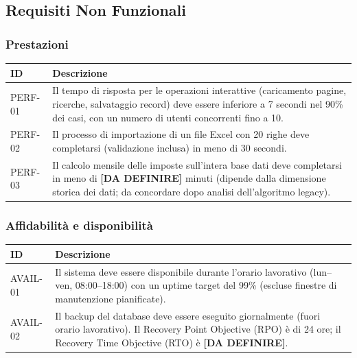 \documentclass[12pt, a4paper]{article}
\begin{document}
\subsection{Requisiti Non Funzionali}

\subsubsection{Prestazioni}

\begin{longtable}{@{}p{2.5cm}p{9.5cm}@{}}
  \toprule
  \textbf{ID} & \textbf{Descrizione} \\
  \midrule
  \endhead

  PERF-01 &
  Il tempo di risposta per le operazioni interattive (caricamento pagine, ricerche, salvataggio
  record) deve essere inferiore a 7 secondi nel 90\% dei casi, con un numero di utenti
  concorrenti fino a 10. \\[6pt]

  PERF-02 &
  Il processo di importazione di un file Excel con 20 righe deve completarsi (validazione
  inclusa) in meno di 30 secondi. \\[6pt]

  PERF-03 &
  Il calcolo mensile delle imposte sull'intera base dati deve completarsi in meno di
  \textbf{[DA DEFINIRE]} minuti (dipende dalla dimensione storica dei dati; da concordare
  dopo analisi dell'algoritmo legacy). \\

  \bottomrule
\end{longtable}

\subsubsection{Affidabilità e disponibilità}

\begin{longtable}{@{}p{2.5cm}p{9.5cm}@{}}
  \toprule
  \textbf{ID} & \textbf{Descrizione} \\
  \midrule
  \endhead

  AVAIL-01 &
  Il sistema deve essere disponibile durante l'orario lavorativo (lun--ven, 08:00--18:00)
  con un uptime target del 99\% (escluse finestre di manutenzione pianificate). \\[6pt]

  AVAIL-02 &
  Il backup del database deve essere eseguito giornalmente (fuori orario lavorativo).
  Il Recovery Point Objective (RPO) è di 24 ore; il Recovery Time Objective (RTO) è
  \textbf{[DA DEFINIRE]}. \\

  \bottomrule
\end{longtable}
\end{document}
